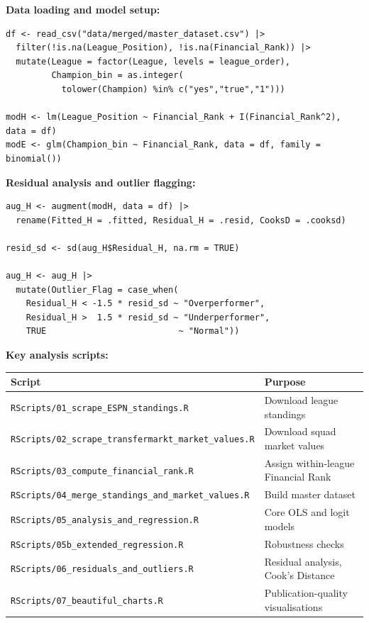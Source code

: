\documentclass[11pt, a4paper]{article}
\begin{document}
\textbf{Data loading and model setup:}
\begin{verbatim}
df <- read_csv("data/merged/master_dataset.csv") |>
  filter(!is.na(League_Position), !is.na(Financial_Rank)) |>
  mutate(League = factor(League, levels = league_order),
         Champion_bin = as.integer(
           tolower(Champion) %in% c("yes","true","1")))

modH <- lm(League_Position ~ Financial_Rank + I(Financial_Rank^2), data = df)
modE <- glm(Champion_bin ~ Financial_Rank, data = df, family = binomial())
\end{verbatim}

\textbf{Residual analysis and outlier flagging:}
\begin{verbatim}
aug_H <- augment(modH, data = df) |>
  rename(Fitted_H = .fitted, Residual_H = .resid, CooksD = .cooksd)

resid_sd <- sd(aug_H$Residual_H, na.rm = TRUE)

aug_H <- aug_H |>
  mutate(Outlier_Flag = case_when(
    Residual_H < -1.5 * resid_sd ~ "Overperformer",
    Residual_H >  1.5 * resid_sd ~ "Underperformer",
    TRUE                          ~ "Normal"))
\end{verbatim}

\textbf{Key analysis scripts:}

\begin{center}
\small
\begin{tabular}{ll}
  \toprule
  Script & Purpose \\
  \midrule
  \texttt{RScripts/01\_scrape\_ESPN\_standings.R}           & Download league standings \\
  \texttt{RScripts/02\_scrape\_transfermarkt\_market\_values.R} & Download squad market values \\
  \texttt{RScripts/03\_compute\_financial\_rank.R}          & Assign within-league Financial Rank \\
  \texttt{RScripts/04\_merge\_standings\_and\_market\_values.R} & Build master dataset \\
  \texttt{RScripts/05\_analysis\_and\_regression.R}         & Core OLS and logit models \\
  \texttt{RScripts/05b\_extended\_regression.R}             & Robustness checks \\
  \texttt{RScripts/06\_residuals\_and\_outliers.R}          & Residual analysis, Cook's Distance \\
  \texttt{RScripts/07\_beautiful\_charts.R}                 & Publication-quality visualisations \\
  \bottomrule
\end{tabular}
\end{center}
\end{document}
